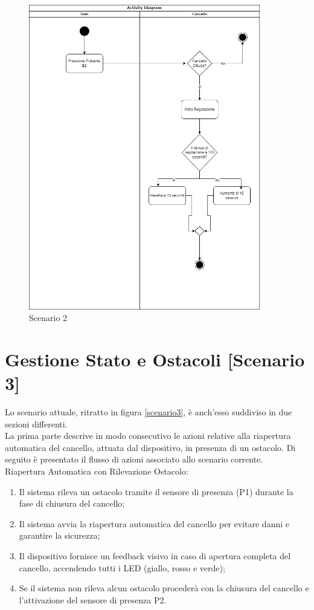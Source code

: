\begin{figure}[H]
    \centering
    \includegraphics[width=0.9\textwidth]{figures/scenario2.png}
    \caption{Scenario 2}
    \label{scenario2}
\end{figure}


\section{Gestione Stato e Ostacoli [Scenario 3]}
\noindent Lo scenario attuale, ritratto in figura \ref{scenario3}, è anch'esso suddiviso in due sezioni differenti. \\

La prima parte descrive in modo consecutivo le azioni relative alla riapertura automatica del cancello, attuata dal dispositivo, in presenza di un ostacolo.
Di seguito è presentato il flusso di azioni associato allo scenario corrente. \\

\noindent Riapertura Automatica con Rilevazione Ostacolo:

\begin{enumerate}
    \item Il sistema rileva un ostacolo tramite il sensore di presenza (P1) durante la fase di chiusura del cancello;
    \item Il sistema avvia la riapertura automatica del cancello per evitare danni e garantire la sicurezza;
    \item Il dispositivo fornisce un feedback visivo in caso di apertura completa del cancello, accendendo tutti i LED (giallo, rosso e verde);
    \item Se il sistema non rileva alcun ostacolo procederà con la chiusura del cancello e l'attivazione del sensore di presenza P2.
\end{enumerate}

